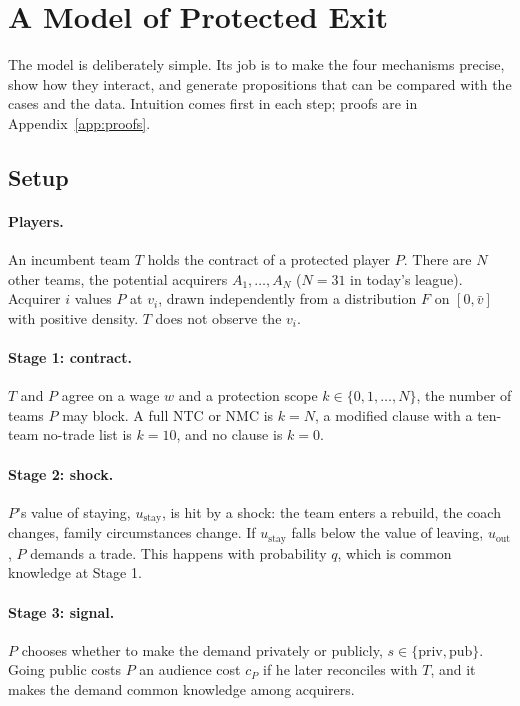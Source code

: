 \section{A Model of Protected Exit}\label{sec:model}

The model is deliberately simple. Its job is to make the four mechanisms precise, show how they interact, and generate propositions that can be compared with the cases and the data. Intuition comes first in each step; proofs are in Appendix~\ref{app:proofs}.

\subsection{Setup}

\paragraph{Players.} An incumbent team $T$ holds the contract of a protected player $P$. There are $N$ other teams, the potential acquirers $A_1,\dots,A_N$ ($N=31$ in today's league). Acquirer $i$ values $P$ at $v_i$, drawn independently from a distribution $F$ on $[0,\bar v]$ with positive density. $T$ does not observe the $v_i$.

\paragraph{Stage 1: contract.} $T$ and $P$ agree on a wage $w$ and a protection scope $k\in\{0,1,\dots,N\}$, the number of teams $P$ may block. A full NTC or NMC is $k=N$, a modified clause with a ten-team no-trade list is $k=10$, and no clause is $k=0$.

\paragraph{Stage 2: shock.} $P$'s value of staying, $u_{\text{stay}}$, is hit by a shock: the team enters a rebuild, the coach changes, family circumstances change. If $u_{\text{stay}}$ falls below the value of leaving, $u_{\text{out}}$, $P$ demands a trade. This happens with probability $q$, which is common knowledge at Stage 1.

\paragraph{Stage 3: signal.} $P$ chooses whether to make the demand privately or publicly, $s\in\{\text{priv},\text{pub}\}$. Going public costs $P$ an audience cost $c_P$ if he later reconciles with $T$, and it makes the demand common knowledge among acquirers.

